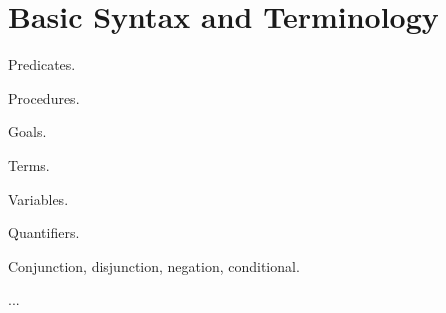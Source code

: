 \section{Basic Syntax and Terminology}

Predicates.

Procedures.

Goals.

Terms.

Variables.

Quantifiers.

Conjunction, disjunction, negation, conditional.

...




